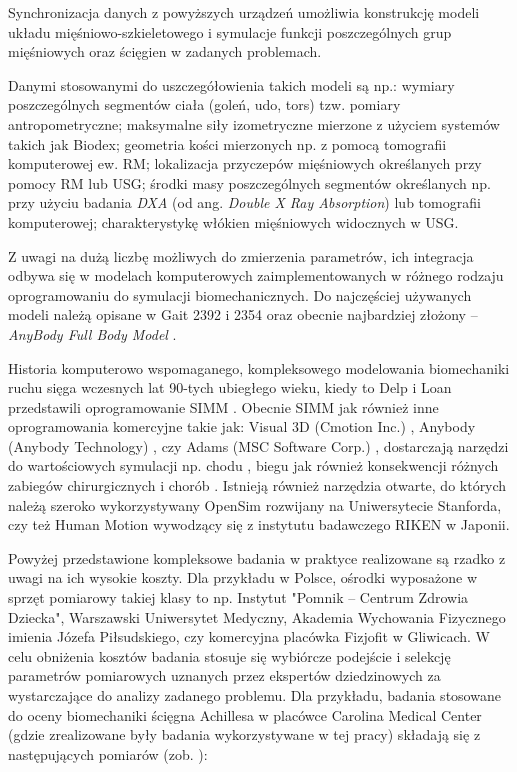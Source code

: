 Synchronizacja danych z powyższych urządzeń umożliwia konstrukcję modeli układu mięśniowo-szkieletowego i symulacje funkcji poszczególnych grup mięśniowych oraz ścięgien w zadanych problemach.

Danymi stosowanymi do uszczegółowienia takich modeli są np.: wymiary poszczególnych segmentów ciała (goleń, udo, tors) tzw. pomiary antropometryczne; maksymalne siły izometryczne mierzone z użyciem systemów takich jak Biodex; geometria kości mierzonych np. z pomocą tomografii komputerowej ew. RM; lokalizacja przyczepów mięśniowych określanych przy pomocy RM lub USG; środki masy poszczególnych segmentów określanych np. przy użyciu badania \textit{DXA} (od ang. \textit{Double X Ray Absorption}) lub tomografii komputerowej; charakterystykę włókien mięśniowych widocznych w USG.

Z uwagi na dużą liczbę możliwych do zmierzenia parametrów, ich integracja odbywa się w modelach komputerowych zaimplementowanych w różnego rodzaju oprogramowaniu do symulacji biomechanicznych. Do najczęściej używanych modeli należą opisane w \cite{John2013} Gait 2392 i 2354 oraz obecnie najbardziej złożony -- \textit{AnyBody Full Body Model} \cite{Bassani2017}. 

Historia komputerowo wspomaganego, kompleksowego modelowania biomechaniki ruchu sięga wczesnych lat 90-tych ubiegłego wieku, kiedy to Delp i Loan przedstawili oprogramowanie SIMM \cite{Delp1990}. Obecnie SIMM jak również inne oprogramowania komercyjne takie jak: Visual 3D (Cmotion Inc.) \cite{Visual3D}, Anybody (Anybody Technology) \cite{AnyBody}, czy Adams (MSC Software Corp.) \cite{Adams}, dostarczają narzędzi \linebreak do wartościowych symulacji np. chodu \cite{Steele2010}, biegu \cite{Hamner2010} jak również konsekwencji różnych zabiegów chirurgicznych \cite{Gomes2013} i chorób \cite{Shao2009}. Istnieją również narzędzia otwarte, do których należą szeroko wykorzystywany OpenSim \cite{Delp2007} rozwijany na Uniwersytecie Stanforda, czy też Human Motion \cite{Riken} wywodzący się z instytutu badawczego RIKEN w Japonii.

Powyżej przedstawione kompleksowe badania w praktyce realizowane są rzadko z uwagi na ich wysokie koszty. Dla przykładu w Polsce, ośrodki wyposażone \linebreak w sprzęt pomiarowy takiej klasy to np. Instytut "Pomnik – Centrum Zdrowia Dziecka", Warszawski Uniwersytet Medyczny, Akademia Wychowania Fizycznego imienia Józefa Piłsudskiego, czy komercyjna placówka Fizjofit w Gliwicach. W celu obniżenia kosztów badania stosuje się wybiórcze podejście i selekcję parametrów pomiarowych uznanych przez ekspertów dziedzinowych za wystarczające do analizy zadanego problemu. Dla przykładu, badania stosowane do oceny biomechaniki ścięgna Achillesa w placówce Carolina Medical Center (gdzie zrealizowane były badania wykorzystywane w tej pracy) składają się z następujących pomiarów (zob. \cite{CMC}):

